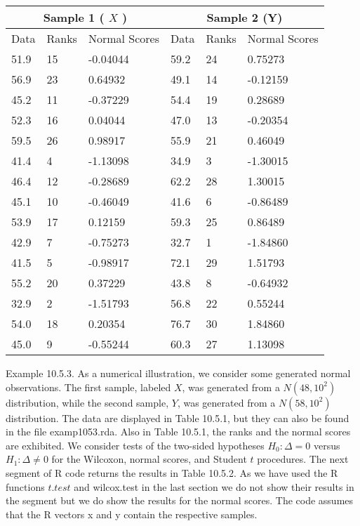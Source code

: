 \begin{center}
\begin{tabular}{|l|l|l|l|l|l|}
\hline
\multicolumn{3}{|c|}{Sample 1 ( $X$ )} & \multicolumn{3}{|c|}{Sample 2 (Y)} \\
\hline
Data & Ranks & Normal Scores & Data & Ranks & Normal Scores \\
\hline
51.9 & 15 & -0.04044 & 59.2 & 24 & 0.75273 \\
\hline
56.9 & 23 & 0.64932 & 49.1 & 14 & -0.12159 \\
\hline
45.2 & 11 & -0.37229 & 54.4 & 19 & 0.28689 \\
\hline
52.3 & 16 & 0.04044 & 47.0 & 13 & -0.20354 \\
\hline
59.5 & 26 & 0.98917 & 55.9 & 21 & 0.46049 \\
\hline
41.4 & 4 & -1.13098 & 34.9 & 3 & -1.30015 \\
\hline
46.4 & 12 & -0.28689 & 62.2 & 28 & 1.30015 \\
\hline
45.1 & 10 & -0.46049 & 41.6 & 6 & -0.86489 \\
\hline
53.9 & 17 & 0.12159 & 59.3 & 25 & 0.86489 \\
\hline
42.9 & 7 & -0.75273 & 32.7 & 1 & -1.84860 \\
\hline
41.5 & 5 & -0.98917 & 72.1 & 29 & 1.51793 \\
\hline
55.2 & 20 & 0.37229 & 43.8 & 8 & -0.64932 \\
\hline
32.9 & 2 & -1.51793 & 56.8 & 22 & 0.55244 \\
\hline
54.0 & 18 & 0.20354 & 76.7 & 30 & 1.84860 \\
\hline
45.0 & 9 & -0.55244 & 60.3 & 27 & 1.13098 \\
\hline
\end{tabular}
\end{center}

Example 10.5.3. As a numerical illustration, we consider some generated normal observations. The first sample, labeled $X$, was generated from a $N\left(48,10^{2}\right)$ distribution, while the second sample, $Y$, was generated from a $N\left(58,10^{2}\right)$ distribution. The data are displayed in Table 10.5.1, but they can also be found in the file examp1053.rda. Also in Table 10.5.1, the ranks and the normal scores are exhibited. We consider tests of the two-sided hypotheses $H_{0}: \Delta=0$ versus $H_{1}: \Delta \neq 0$ for the Wilcoxon, normal scores, and Student $t$ procedures. The next segment of R code returns the results in Table 10.5.2. As we have used the R functions $t . t e s t$ and wilcox.test in the last section we do not show their results in the segment but we do show the results for the normal scores. The code assumes that the R vectors x and y contain the respective samples.

